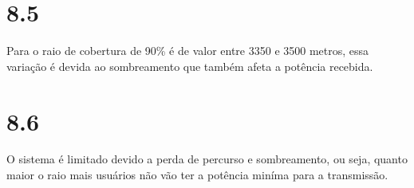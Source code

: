 \documentclass[12pt]{article}
\begin{document}
\section{\huge 8.5}
Para o raio de cobertura de 90\% é de valor entre 3350 e 3500 metros, essa variação é devida ao sombreamento que também afeta a potência recebida.
\section{\huge 8.6}
O sistema é limitado devido a perda de percurso e sombreamento, ou seja, quanto maior o raio mais usuários não vão ter a potência miníma para a transmissão.
\end{document}
